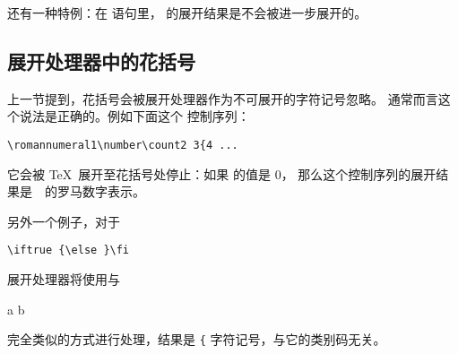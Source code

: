 \documentclass{book}
\begin{document}
还有一种特例：在  语句里，
 的展开结果是不会被进一步展开的。

\subsection{展开处理器中的花括号}

上一节提到，花括号会被展开处理器作为不可展开的字符记号忽略。
通常而言这个说法是正确的。例如下面这个  控制序列：
\begin{verbatim}
\romannumeral1\number\count2 3{4 ...
\end{verbatim}
它会被 \TeX\ 展开至花括号处停止：如果  的值是 0，
那么这个控制序列的展开结果是~~的罗马数字表示。

另外一个例子，对于
\begin{verbatim}
\iftrue {\else }\fi
\end{verbatim}
展开处理器将使用与
\begin{disp} {\italic a} {\italic b}\end{disp}
完全类似的方式进行处理，结果是 \verb|{| 字符记号，与它的类别码无关。
\end{document}
